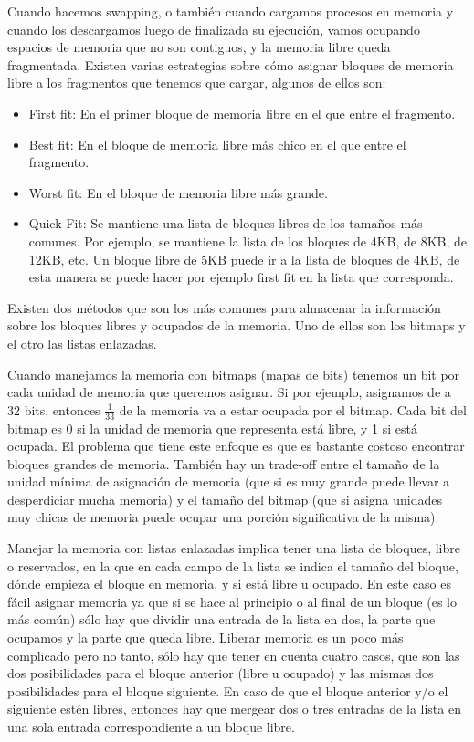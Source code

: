 \documentclass{article}
\begin{document}
Cuando hacemos swapping, o tambi\'en cuando cargamos procesos en memoria y cuando los descargamos luego de finalizada su ejecuci\'on, vamos ocupando espacios de memoria que no son contiguos, y la memoria libre queda fragmentada. Existen varias estrategias sobre c\'omo asignar bloques de memoria libre a los fragmentos que tenemos que cargar, algunos de ellos son:

\begin{itemize}
\item First fit: En el primer bloque de memoria libre en el que entre el fragmento.
\item Best fit: En el bloque de memoria libre m\'as chico en el que entre el fragmento.
\item Worst fit: En el bloque de memoria libre m\'as grande.
\item Quick Fit: Se mantiene una lista de bloques libres de los tama\~nos m\'as comunes. Por ejemplo, se mantiene la lista de los bloques de 4KB, de 8KB, de 12KB, etc. Un bloque libre de 5KB puede ir a la lista de bloques de 4KB, de esta manera se puede hacer por ejemplo first fit en la lista que corresponda.
\end{itemize}

Existen dos m\'etodos que son los m\'as comunes para almacenar la informaci\'on sobre los bloques libres y ocupados de la memoria. Uno de ellos son los bitmaps y el otro las listas enlazadas.

Cuando manejamos la memoria con bitmaps (mapas de bits) tenemos un bit por cada unidad de memoria que queremos asignar. Si por ejemplo, asignamos de a 32 bits, entonces $\frac{1}{33}$ de la memoria va a estar ocupada por el bitmap. Cada bit del bitmap es 0 si la unidad de memoria que representa est\'a libre, y 1 si est\'a ocupada. El problema que tiene este enfoque es que es bastante costoso encontrar bloques grandes de memoria. Tambi\'en hay un trade-off entre el tama\~no de la unidad m\'inima de asignaci\'on de memoria (que si es muy grande puede llevar a desperdiciar mucha memoria) y el tama\~no del bitmap (que si asigna unidades muy chicas de memoria puede ocupar una porci\'on significativa de la misma).

Manejar la memoria con listas enlazadas implica tener una lista de bloques, libre o reservados, en la que en cada campo de la lista se indica el tama\~no del bloque, d\'onde empieza el bloque en memoria, y si est\'a libre u ocupado. En este caso es f\'acil asignar memoria ya que si se hace al principio o al final de un bloque (es lo m\'as com\'un) s\'olo hay que dividir una entrada de la lista en dos, la parte que ocupamos y la parte que queda libre. Liberar memoria es un poco m\'as complicado pero no tanto, s\'olo hay que tener en cuenta cuatro casos, que son las dos posibilidades para el bloque anterior (libre u ocupado) y las mismas dos posibilidades para el bloque siguiente. En caso de que el bloque anterior y/o el siguiente est\'en libres, entonces hay que mergear dos o tres entradas de la lista en una sola entrada correspondiente a un bloque libre.
\end{document}
